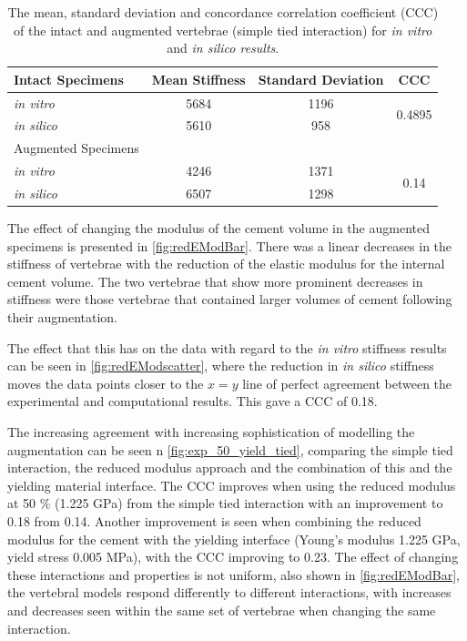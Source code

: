 \begin{table}[ht]
\centering
	\caption{The mean, standard deviation and concordance correlation coefficient (CCC) of the intact and augmented vertebrae (simple tied interaction) for \textit{in vitro} and \textit{in silico results}.}
\label{tab:int}
\begin{tabular}{l|c|c|c}
     Intact Specimens     & Mean Stiffness & Standard Deviation & CCC                     \\ \hline \hline
\textit{in vitro}  & 5684 & 1196             & \multirow{2}{*}{0.4895} \\
\textit{in silico} & 5610 & 958               &                        \\
\hline
 Augmented Specimens
 \\ \hline \hline
\textit{in vitro}  & 4246 & 1371               & \multirow{2}{*}{0.14} \\
\textit{in silico} & 6507 & 1298               &                      \\ \hline
\end{tabular}
\end{table}

The effect of changing the modulus of the cement volume in the augmented
specimens is presented in \cref{fig:redEModBar}. There was a linear decreases
in the stiffness of vertebrae with the reduction of the elastic modulus for the
internal cement volume. The two vertebrae that show more prominent decreases in
stiffness were those vertebrae that contained larger volumes of cement
following their augmentation.

The effect that this has on the data with regard to the \textit{in vitro}
stiffness results can be seen in \cref{fig:redEModscatter}, where the reduction
in \textit{in silico} stiffness moves the data points closer to the $x = y$
line of perfect agreement between the experimental and computational results.
This gave a CCC of 0.18.

The increasing agreement with increasing sophistication of
modelling the augmentation can be seen n \cref{fig:exp_50_yield_tied},
comparing the simple tied interaction, the reduced modulus approach and the
combination of this and the yielding material interface.  The CCC improves when
using the reduced modulus at 50 \% (1.225 GPa) from the simple tied interaction
with an improvement to 0.18 from 0.14.  Another improvement is seen when
combining the reduced modulus for the cement with the yielding interface
(Young's modulus 1.225 GPa, yield stress 0.005 MPa), with the CCC improving to
0.23.  The effect of changing these interactions and properties is not uniform,
also shown in \cref{fig:redEModBar}, the vertebral models respond differently
to different interactions, with increases and decreases seen within the same
set of vertebrae when changing the
same interaction.

